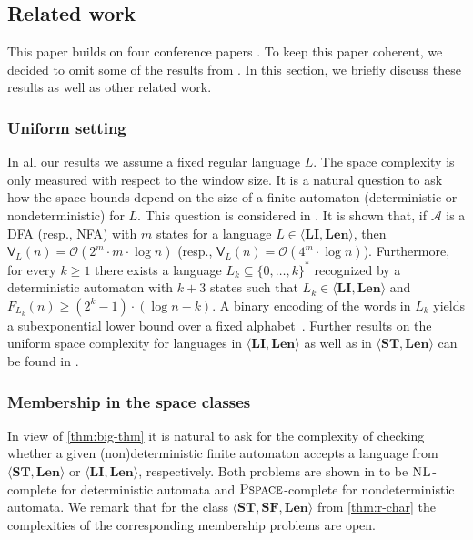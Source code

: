 \documentclass{article}\usepackage[a4paper,margin=20mm]{geometry}
\newcommand{\A}{\mathcal{A}}
\renewcommand{\O}{\mathcal{O}}
\newcommand{\V}{\mathsf{V}}
\newcommand{\NL}{\textsc{NL}}
\newcommand{\PSPACE}{\textsc{Pspace}}
\newcommand{\Len}{\mathbf{Len}}
\newcommand{\LI}{\mathbf{LI}}
\newcommand{\ST}{\mathbf{ST}}
\newcommand{\SF}{\mathbf{SF}}
\renewcommand{\geq}{\geqslant}
\renewcommand{\ge}{\geq}
\begin{document}
\subsection{Related work} \label{sec-related}

This paper builds on four conference papers \cite{GanardiHKLM18,GanardiHL16,GanardiHL18,GanardiHLS19}.
To keep this paper coherent, we decided to omit some of the results from \cite{GanardiHKLM18,GanardiHL16,GanardiHL18,GanardiHLS19}. In this section, we briefly
discuss these results as well as other related work.

\label{sec:omitted}

\subsubsection{Uniform setting}

In all our results we assume a fixed regular language $L$. The space complexity is only measured with respect
to the window size. It is a natural question to ask how the space bounds depend on the size of a finite automaton
(deterministic or nondeterministic) for $L$. This question is considered in \cite{GanardiHKLM18}.
It is shown that,
if $\A$ is a DFA (resp., NFA) with $m$ states for a language $L \in \langle \LI, \Len \rangle$,
then $\V_L(n) = \O(2^m \cdot m \cdot \log n)$ (resp., $\V_L(n)=\O(4^m \cdot \log n)$).
Furthermore, for every 
$k \ge 1$ there exists a language $L_k \subseteq \{0, \ldots, k\}^*$
recognized by a deterministic automaton with $k+3$ states
such that $L_k \in \langle \LI, \Len \rangle$ and 
$F_{L_k}(n) \geq (2^k-1) \cdot (\log n - k)$.
A binary encoding of the words in $L_k$ yields a subexponential lower bound over a fixed alphabet~\cite[Theorem~4.45]{GanardiPhD}.
Further results on the uniform space complexity for languages in $\langle \LI, \Len \rangle$ as well as in $\langle \ST, \Len \rangle$ can be found in \cite[Section~4.3]{GanardiPhD}.

\subsubsection{Membership in the space classes}

In view of \cref{thm:big-thm} it is natural to ask for the complexity of checking whether a given (non)deterministic
finite automaton accepts a language from $\langle \ST, \Len \rangle$ or $\langle \LI, \Len \rangle$, respectively.
Both problems are shown in \cite{GanardiHKLM18} to be $\NL$-complete for deterministic automata and $\PSPACE$-complete for 
nondeterministic automata. We remark that for the class  $\langle \ST, \SF, \Len \rangle$ from 
\cref{thm:r-char} the complexities of the corresponding membership problems are open.
\end{document}
